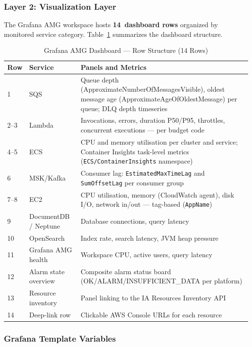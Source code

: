 \subsubsection{Layer 2: Visualization Layer}

The Grafana AMG workspace hosts \textbf{14~dashboard rows} organized by
monitored service category. Table~\ref{tab:dashboard_rows} summarizes the
dashboard structure.

\begin{table}[ht]
\centering
\caption{Grafana AMG Dashboard --- Row Structure (14 Rows)}
\label{tab:dashboard_rows}
\begin{tabular}{p{0.5cm}p{3.0cm}p{8.5cm}}
\toprule
\textbf{Row} & \textbf{Service} & \textbf{Panels and Metrics} \\
\midrule
1 & SQS & Queue depth (ApproximateNumberOfMessagesVisible), oldest message age (ApproximateAgeOfOldestMessage) per queue; DLQ depth timeseries \\
\midrule
2--3 & Lambda & Invocations, errors, duration P50/P95, throttles, concurrent executions --- per budget code \\
\midrule
4--5 & ECS & CPU and memory utilisation per cluster and service; Container Insights task-level metrics (\texttt{ECS/ContainerInsights} namespace) \\
\midrule
6 & MSK/Kafka & Consumer lag: \texttt{EstimatedMaxTimeLag} and \texttt{SumOffsetLag} per consumer group \\
\midrule
7--8 & EC2 & CPU utilisation, memory (CloudWatch agent), disk I/O, network in/out --- tag-based (\texttt{AppName}) \\
\midrule
9 & DocumentDB / Neptune & Database connections, query latency \\
\midrule
10 & OpenSearch & Index rate, search latency, JVM heap pressure \\
\midrule
11 & Grafana AMG health & Workspace CPU, active users, query latency \\
\midrule
12 & Alarm state overview & Composite alarm status board (OK/ALARM/INSUFFICIENT\_DATA per platform) \\
\midrule
13 & Resource inventory & Panel linking to the IA Resources Inventory API \\
\midrule
14 & Deep-link row & Clickable AWS Console URLs for each resource \\
\bottomrule
\end{tabular}
\end{table}

\subsubsection{Grafana Template Variables}

